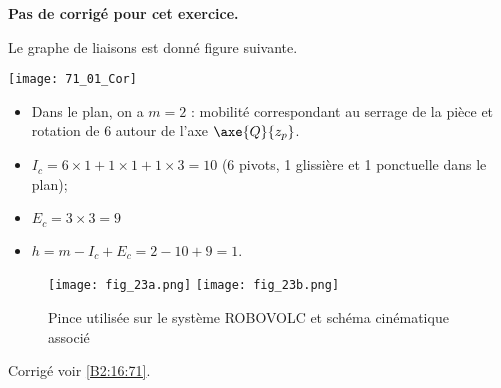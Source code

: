 \normaltrue \difficilefalse \tdifficilefalse
\correctiontrue

\exer{ $\star$ \label{B2:16:71}}
\setcounter{question}{0}


\ifcorrection
\else
\textbf{Pas de corrigé pour cet exercice.}
\fi


\ifprof
Le graphe de liaisons est donné figure suivante. 

\begin{center}
\texttt{[image: 71\_01\_Cor]}
\end{center}
\begin{itemize}
\item Dans le plan, on a $m=2$ : mobilité correspondant au serrage de la pièce et rotation de 6 autour de l'axe $\axe{Q}{z_p}$.
\item $I_c = 6\times 1 + 1 \times 1 + 1 \times 3 = 10$ (6 pivots, 1 glissière et 1 ponctuelle dans le plan);
\item $E_c = 3 \times 3 = 9$
\item $h=m-I_c+E_c = 2-10+9 = 1$. 
\end{itemize}
\else
\fi

\ifprof
\else
\begin{figure}[H]
\centering
\texttt{[image: fig\_23a.png]}
\texttt{[image: fig\_23b.png]}
\caption{Pince utilisée sur le système ROBOVOLC et schéma cinématique associé \label{fig_23}}
\end{figure} 
\fi 

\ifprof
\else

\noindent\footnotesize
\normalsize

\begin{flushright}
\footnotesize{Corrigé  voir \ref{B2:16:71}.}
\end{flushright}%
\fi